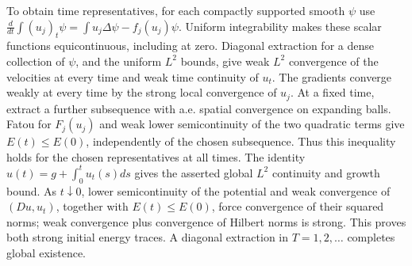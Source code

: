 \begin{expandedproof}
To obtain time representatives, for each compactly supported smooth
$\psi$ use
$\frac d{dt}\int(u_j)_t\psi=\int u_j\Delta\psi-f_j(u_j)\psi$.
Uniform integrability makes these scalar functions equicontinuous,
including at zero. Diagonal extraction for a dense collection of
$\psi$, and the uniform $L^2$ bounds, give weak $L^2$ convergence
of the velocities at every time and weak time continuity of $u_t$.
The gradients converge weakly at every time by the strong local
convergence of $u_j$. At a fixed time, extract a further subsequence
with a.e. spatial convergence on expanding balls. Fatou for $F_j(u_j)$
and weak lower semicontinuity of the two quadratic terms give
$E(t)\le E(0)$, independently of the chosen subsequence.
Thus this inequality holds for the chosen representatives at all times.
The identity $u(t)=g+\int_0^t u_t(s)ds$ gives the asserted global
$L^2$ continuity and growth bound. As $t\downarrow0$, lower
semicontinuity of the potential and weak convergence of $(Du,u_t)$,
together with $E(t)\le E(0)$, force convergence of their squared
norms; weak convergence plus convergence of Hilbert norms is strong.
This proves both strong initial energy traces. A diagonal extraction
in $T=1,2,\ldots$ completes global existence.
\end{expandedproof}

